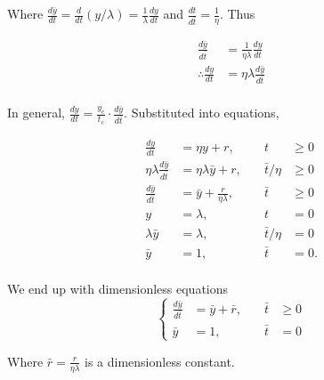 \documentclass[12pt,twoside]{article}
\begin{document}
Where $\frac{d\bar{y}}{dt} = \frac{d}{dt}(y/\lambda) = \frac{1}{\lambda}\frac{dy}{dt}$ and
$\frac{dt}{d\bar{t}} = \frac{1}{\eta}$. Thus

\begin{equation}
  \begin{aligned}
    \frac{d\bar{y}}{d\bar{t}} &= \frac{1}{\eta\lambda}\frac{dy}{dt} \\
    \therefore \frac{dy}{dt} &= \eta\lambda\frac{d\bar{y}}{d\bar{t}} \\
  \end{aligned}
\end{equation}

In general, $\frac{dy}{dt} = \frac{y_c}{t_c} \cdot \frac{d\bar{y}}{d\bar{t}}$.
Substituted into equations,

\begin{equation}
  \begin{aligned}
    \frac{dy}{dt} &= \eta y+r, &\quad t&\ge0 \\
    \eta\lambda\frac{d\bar{y}}{d\bar{t}} &= \eta\lambda\bar{y}+r, &\quad \bar{t}/\eta&\ge0 \\
    \frac{d\bar{y}}{d\bar{t}} &= \bar{y}+\frac{r}{\eta\lambda}, &\quad \bar{t}&\ge0 \\
    y &= \lambda, &\quad t&=0 \\
    \lambda\bar{y} &= \lambda, &\quad \bar{t}/\eta &= 0 \\
    \bar{y} &= 1, &\quad\bar{t}&=0. \\
  \end{aligned}
\end{equation}

We end up with dimensionless equations
\begin{equation} \left\{
  \begin{aligned}
    \frac{d\bar{y}}{d\bar{t}} &= \bar{y} + \bar{r}, &\quad \bar{t}&\ge0 \\
    \bar{y} &= 1, &\quad \bar{t} &= 0
  \end{aligned} \right.
\end{equation}

Where $\bar{r} = \frac{r}{\eta\lambda}$ is a dimensionless constant.
\end{document}
